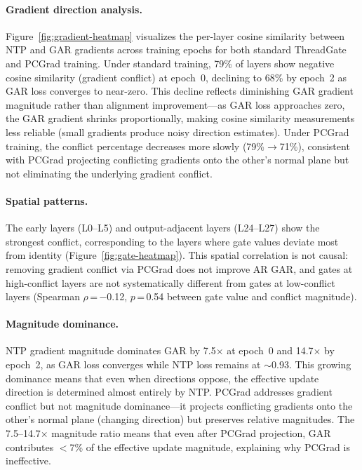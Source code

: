 \paragraph{Gradient direction analysis.} Figure~\ref{fig:gradient-heatmap} visualizes the per-layer cosine similarity between NTP and GAR gradients across training epochs for both standard ThreadGate and PCGrad training. Under standard training, 79\% of layers show negative cosine similarity (gradient conflict) at epoch~0, declining to 68\% by epoch~2 as GAR loss converges to near-zero. This decline reflects diminishing GAR gradient magnitude rather than alignment improvement---as GAR loss approaches zero, the GAR gradient shrinks proportionally, making cosine similarity measurements less reliable (small gradients produce noisy direction estimates). Under PCGrad training, the conflict percentage decreases more slowly (79\%$\to$71\%), consistent with PCGrad projecting conflicting gradients onto the other's normal plane but not eliminating the underlying gradient conflict.

\paragraph{Spatial patterns.} The early layers (L0--L5) and output-adjacent layers (L24--L27) show the strongest conflict, corresponding to the layers where gate values deviate most from identity (Figure~\ref{fig:gate-heatmap}). This spatial correlation is not causal: removing gradient conflict via PCGrad does not improve AR GAR, and gates at high-conflict layers are not systematically different from gates at low-conflict layers (Spearman $\rho$\,=\,$-$0.12, $p$\,=\,0.54 between gate value and conflict magnitude).

\paragraph{Magnitude dominance.} NTP gradient magnitude dominates GAR by 7.5$\times$ at epoch~0 and 14.7$\times$ by epoch~2, as GAR loss converges while NTP loss remains at $\sim$0.93. This growing dominance means that even when directions oppose, the effective update direction is determined almost entirely by NTP. PCGrad addresses gradient conflict but not magnitude dominance---it projects conflicting gradients onto the other's normal plane (changing direction) but preserves relative magnitudes. The 7.5--14.7$\times$ magnitude ratio means that even after PCGrad projection, GAR contributes $<$7\% of the effective update magnitude, explaining why PCGrad is ineffective.

